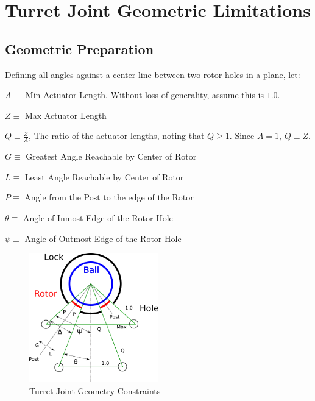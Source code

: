 \documentclass[11pt]{article}
\begin{document}





\newpage



\appendix

\section{Turret Joint Geometric Limitations}

\label{phiproof}

\subsection{Geometric Preparation}



Defining all angles against a center line between two rotor holes in a plane,
let:

$ A \equiv $ Min Actuator Length. Without loss of generality, assume this is $ 1.0 $.

$ Z \equiv $ Max Actuator Length

$ Q \equiv \frac{Z}{A} $, The ratio of the actuator lengths, noting that $Q \geq 1$. Since $A = 1$, $Q \equiv Z$.

$ G \equiv $ Greatest Angle Reachable by Center of Rotor

$ L \equiv $ Least Angle Reachable by Center of Rotor

$ P \equiv $ Angle from the Post to the edge of the Rotor

$ \theta \equiv $ Angle of Inmost Edge of the Rotor Hole

$ \psi \equiv $ Angle of Outmost Edge of the Rotor Hole



\begin{figure}[H]
  \centering
    \includegraphics[width=0.5\textwidth]{figures/ConstraintDrawing.png}
    \caption[Constraints]{Turret Joint Geometry Constraints}
      \label{constraint-drawing}
\end{figure}
\end{document}
